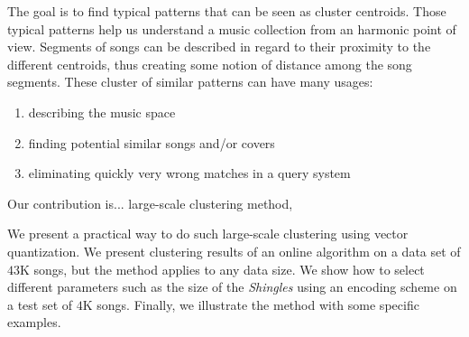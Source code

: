 \documentclass{article}
\begin{document}
%

The goal is to find typical patterns that can be seen as cluster centroids.
Those typical patterns help us understand a music collection from an
harmonic point of view. Segments of songs can be described in regard to their
proximity to the different centroids, thus creating some notion of distance
among the song segments. These cluster of similar patterns can have many usages:
\begin{enumerate}
\item describing the music space
\item finding potential similar songs and/or covers
\item eliminating quickly very wrong matches in a query system
\end{enumerate}

Our contribution is... large-scale clustering method, 


We present a practical way to do such large-scale clustering using vector
quantization. We present clustering results of an online algorithm on a data 
set of $43$K songs, but the method applies to any data size. We show how to
select different parameters such as the size of the \textit{Shingles} 
using an encoding scheme on a test set of $4$K songs. Finally, we illustrate
the method with some specific examples.
\end{document}
